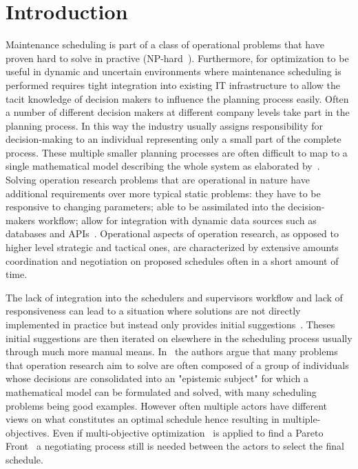\section{Introduction}
Maintenance scheduling is part of a class of operational problems that have proven hard to solve in practive (NP-hard~\citep{garey1979computers}).
Furthermore, for optimization to be useful in dynamic and uncertain environments where maintenance scheduling 
is performed requires tight integration into existing IT infrastructure to allow the  tacit knowledge of decision makers to influence
the planning process easily. Often a number of different decision makers at different company levels take part in the
planning process. In this way the industry usually assigns responsibility for decision-making to an individual
representing only a small part of the complete process. These multiple smaller planning processes are often difficult
to map to a single mathematical model describing the whole system as elaborated by~\citep{barthelemy2002human}. Solving
operation research problems that are operational in nature have additional requirements over more typical static
problems: they have to be responsive to changing parameters; able to be assimilated into the decision-makers workflow;
allow for integration with dynamic data sources such as databases and APIs~\citep{meignan_review_2015}. Operational
aspects of operation research, as opposed to higher level strategic and tactical ones, are characterized by extensive
amounts coordination and negotiation on proposed schedules often in a short amount of time.

The lack of integration into the schedulers and supervisors workflow and lack of responsiveness can lead to a situation 
where solutions are not directly implemented in practice but instead only provides initial suggestions~\citep{meignan_review_2015}.
Theses initial suggestions are then iterated on elsewhere in the scheduling process usually through much more manual means. 
In~\citep{barthelemy2002human} the authors argue that many problems that operation research aim to solve are often composed
of a group of individuals whose decisions are consolidated into an "epistemic subject" for which a mathematical model can be formulated
and solved, with many scheduling problems being good examples. However often multiple actors have different
views on what constitutes an optimal schedule hence resulting in multiple-objectives. Even if multi-objective
optimization~\citep{ehrgott2002multiple} is applied to find a Pareto Front~\citep{Pareto1897} a negotiating process
still is needed between the actors to select the final schedule. 

